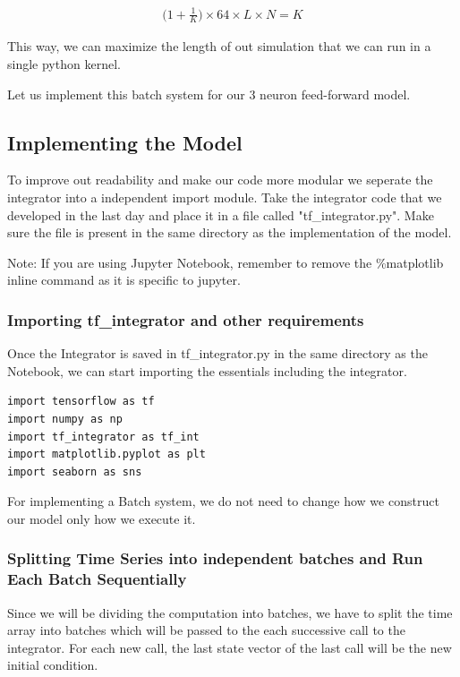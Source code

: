 \documentclass[10pt,letterpaper]{article}
\begin{document}
\begin{eqnarray}\Big(1+\frac{1}{K}\Big)\times64\times L\times N=K\end{eqnarray}

This way, we can maximize the length of out simulation that we can run in a single python kernel.

Let us implement this batch system for our 3 neuron feed-forward model.

\subsection*{Implementing the Model}

To improve out readability and make our code more modular we seperate the integrator into a independent import module. Take the integrator code that we developed in the last day and place it in a file called "tf\_integrator.py". Make sure the file is present in the same directory as the implementation of the model. 

Note: If you are using Jupyter Notebook, remember to remove the \%matplotlib inline command as it is specific to jupyter.

\subsubsection*{Importing tf\_integrator and other requirements}

Once the Integrator is saved in tf\_integrator.py in the same directory as the Notebook, we can start importing the essentials including the integrator.

\begin{verbatim}
import tensorflow as tf
import numpy as np
import tf_integrator as tf_int
import matplotlib.pyplot as plt
import seaborn as sns
\end{verbatim}

For implementing a Batch system, we do not need to change how we construct our model only how we execute it.

\subsubsection*{Splitting Time Series into independent batches and Run Each Batch Sequentially}

Since we will be dividing the computation into batches, we have to split the time array into batches which will be passed to the each successive call to the integrator. For each new call, the last state vector of the last call will be the new initial condition. 
\end{document}

